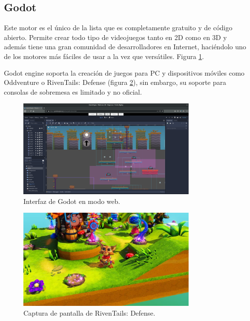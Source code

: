 \subsection{Godot}

Este motor es el único de la lista que es completamente gratuito y de código abierto. Permite crear todo tipo de videojuegos tanto en 2D como en 3D y además tiene una gran comunidad de desarrolladores en Internet, haciéndolo uno de los motores más fáciles de usar a la vez que versátiles. Figura \ref{fig:EA_godot}.

Godot engine soporta la creación de juegos para PC y dispositivos móviles como Oddventure o RivenTails: Defense (figura \ref{fig:EA_rivenTails}), sin embargo, su soporte para consolas de sobremesa es limitado y no oficial.


\begin{figure}[H]
  \centering
\includegraphics[width=0.8\textwidth]{03.EstudioProblema/01.EstadoArte/00.Figuras/32.interfaz_godot.png}
    \caption{Interfaz de Godot en modo web. \cite{EA_img_godot}}
    \label{fig:EA_godot}
\end{figure}

\begin{figure}[H]
  \centering
\includegraphics[width=0.8\textwidth]{03.EstudioProblema/01.EstadoArte/00.Figuras/33.riventails_defense.jpg}
    \caption{Captura de pantalla de RivenTails: Defense. \cite{EA_img_rivenTails}}
    \label{fig:EA_rivenTails}
\end{figure}




